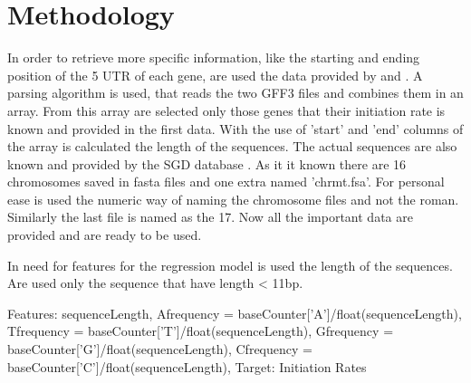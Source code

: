 \documentclass{article}
\begin{document}
\section{Methodology}
In order to retrieve more specific information, like the starting and ending position of the 5 UTR of each gene, are used the data provided by \cite{nagalakshmi2008transcriptional} and \cite{yassour2009ab}. A parsing algorithm is used, that reads the two GFF3 files and combines them in an array. From this array are selected only those genes that their initiation rate is known and provided in the first data. With the use of 'start' and 'end' columns of the array is calculated the length of the sequences. The actual sequences are also known and provided by the SGD database \cite{cherry2011saccharomyces}. As it it known there are 16 chromosomes saved in fasta files and one extra named 'chrmt.fsa'. For personal ease is used the numeric way of naming the chromosome files and not the roman. Similarly the last file is named as the 17. 
Now all the important data are provided and are ready to be used.

In need for features for the regression model is used the length of the sequences. Are used only the sequence that have length < 11bp. 

Features: 
sequenceLength,
Afrequency = baseCounter['A']/float(sequenceLength),
Tfrequency = baseCounter['T']/float(sequenceLength),
Gfrequency = baseCounter['G']/float(sequenceLength),
Cfrequency = baseCounter['C']/float(sequenceLength),
Target:
Initiation Rates















{}
\end{document}
